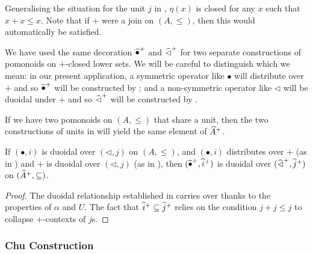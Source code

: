 \begin{remark}
  Generalising the situation for the unit $j$ in , $\eta(x)$ is closed for any $x$
  such that $x + x \leq x$. Note that if $+$ were a join on
  $(A, \leq)$, then this would automatically be satisfied.
\end{remark}

\begin{remark}
  We have used the same decoration $\mathop{\widehat{\bullet}^+}$ and
  $\mathop{\widehat{\lhd}^+}$ for two separate constructions of pomonoids on
  $+$-closed lower sets. We will be careful to distinguish which we
  mean: in our present application, a symmetric operator like
  $\bullet$ will distribute over $+$ and so $\mathop{\widehat{\bullet}^+}$ will
  be constructed by ; and
  a non-symmetric operator like $\lhd$ will be duoidal under $+$ and
  so $\mathop{\widehat{\lhd}^+}$ will be constructed by .
\end{remark}

\begin{remark}
  If we have two pomonoids on $(A, \leq)$ that share a unit, then the
  two constructions of units in  will yield the same element of
  $\widehat{A}^+$.
\end{remark}

\begin{proposition}
  If $(\bullet, i)$ is duoidal over $(\lhd, j)$ on $(A, \leq)$, and
  $(\bullet, i)$ distributes over $+$ (as in ) and $+$ is duoidal over
  $(\lhd, j)$ (as in ),
  then $(\mathop{\widehat{\bullet}^+}, \mathop{\widehat{i}^+})$ is duoidal over
  $(\mathop{\widehat{\lhd}^+}, \mathop{\widehat{j}^+})$ on
  $(\widehat{A}^+, \subseteq)$.
\end{proposition}

\begin{proof}
  The duoidal relationship established in  carries over thanks to the properties
  of $\alpha$ and $U$. The fact that
  $\mathop{\widehat{i}^+} \subseteq \mathop{\widehat{j}^+}$ relies on the condition
  $j + j \leq j$ to collapse $+$-contexts of $j$s.
\end{proof}

\subsubsection{Chu Construction}
\label{sec:chu}

